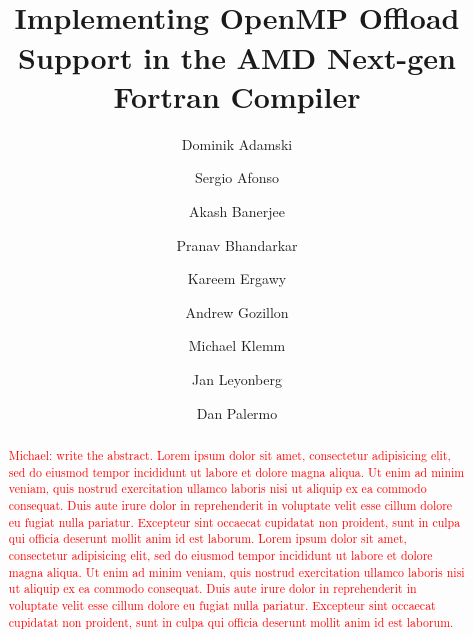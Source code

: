 \documentclass[acmtog,natbib=false]{acmart}
\newcommand{\todo}[1]{\textcolor{red}{#1}}
\newcommand{\registered}[0]{\textsuperscript{\textregistered}\xspace}
\begin{document}
\title{Implementing OpenMP\registered Offload Support in the AMD Next-gen Fortran Compiler}

\author{Dominik Adamski}
\orcid{}

\author{Sergio Afonso}

\author{Akash Banerjee}
\orcid{}

\author{Pranav Bhandarkar}

\author{Kareem Ergawy}

\author{Andrew Gozillon}

\author{Michael Klemm}

\author{Jan Leyonberg}

\author{Dan Palermo}

\renewcommand{\shortauthors}{Adamski et al.}

\begin{abstract}
\todo{Michael: write the abstract.}
\todo{Lorem ipsum dolor sit amet, consectetur adipisicing elit, sed do eiusmod
tempor incididunt ut labore et dolore magna aliqua. Ut enim ad minim veniam,
quis nostrud exercitation ullamco laboris nisi ut aliquip ex ea commodo
consequat. Duis aute irure dolor in reprehenderit in voluptate velit esse
cillum dolore eu fugiat nulla pariatur. Excepteur sint occaecat cupidatat non
proident, sunt in culpa qui officia deserunt mollit anim id est laborum.
Lorem ipsum dolor sit amet, consectetur adipisicing elit, sed do eiusmod
tempor incididunt ut labore et dolore magna aliqua. Ut enim ad minim veniam,
quis nostrud exercitation ullamco laboris nisi ut aliquip ex ea commodo
consequat. Duis aute irure dolor in reprehenderit in voluptate velit esse
cillum dolore eu fugiat nulla pariatur. Excepteur sint occaecat cupidatat non
proident, sunt in culpa qui officia deserunt mollit anim id est laborum.}
\end{abstract}
\end{document}
